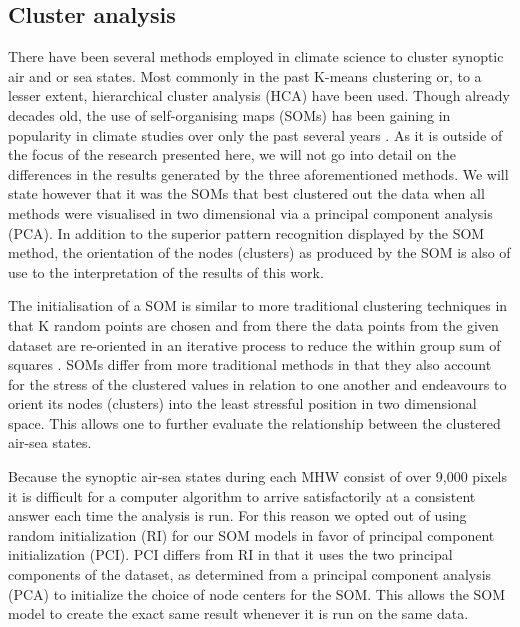 \documentclass[a4paper,10pt,review]{elsarticle}
\begin{document}
\subsection{Cluster analysis}
There have been several methods employed in climate science to cluster synoptic air and or sea states. Most commonly in the past K-means clustering \citep[e.g.]{Corte-Real1998, Burrough2001, Kumar2011} or, to a lesser extent, hierarchical cluster analysis (HCA) \citep[e.g.][]{Unal2003} have been used. Though already decades old, the use of self-organising maps (SOMs) has been gaining in popularity in climate studies over only the past several years \citep[e.g.][]{Cavazos2000, Hewitson2002, Morioka2010}. As it is outside of the focus of the research presented here, we will not go into detail on the differences in the results generated by the three aforementioned methods. We will state however that it was the SOMs that best clustered out the data when all methods were visualised in two dimensional via a principal component analysis (PCA). In addition to the superior pattern recognition displayed by the SOM method, the orientation of the nodes (clusters) as produced by the SOM is also of use to the interpretation of the results of this work.

The initialisation of a SOM is similar to more traditional clustering techniques in that K random points are chosen and from there the data points from the given dataset are re-oriented in an iterative process to reduce the within group sum of squares \citep{Jain2010}. SOMs differ from more traditional methods in that they also account for the stress of the clustered values in relation to one another and endeavours to orient its nodes (clusters) into the least stressful position in two dimensional space. This allows one to further evaluate the relationship between the clustered air-sea states. 

Because the synoptic air-sea states during each MHW consist of over 9,000 pixels it is difficult for a computer algorithm to arrive satisfactorily at a consistent answer each time the analysis is run. For this reason we opted out of using random initialization (RI) for our SOM models in favor of principal component initialization (PCI). PCI differs from RI in that it uses the two principal components of the dataset, as determined from a principal component analysis (PCA) to initialize the choice of node centers for the SOM. This allows the SOM model to create the exact same result whenever it is run on the same data.
\end{document}
